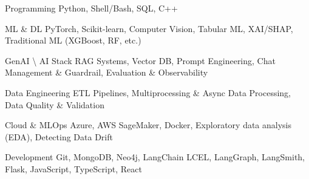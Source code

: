 

\begin{cvskills}

\vspace{0.05cm}

\cvskill
    {Programming} %
    {Python, Shell/Bash, SQL, C++} %

\vspace{0.05cm}

\cvskill
    {ML \& DL}
    {PyTorch, Scikit-learn, Computer Vision, Tabular ML, XAI/SHAP, Traditional ML (XGBoost, RF, etc.)}

\vspace{0.05cm}

\cvskill
    {GenAI \textbackslash{} AI Stack}
    {RAG Systems, Vector DB, Prompt Engineering, Chat Management \& Guardrail, Evaluation \& Observability}


\vspace{0.05cm}

\cvskill
    {Data Engineering}
    {ETL Pipelines, Multiprocessing \& Async Data Processing, Data Quality \& Validation}

\vspace{0.05cm}

\cvskill
    {Cloud \& MLOps}
    {Azure, AWS SageMaker, Docker, Exploratory data analysis (EDA), Detecting Data Drift}


\vspace{0.05cm}

\cvskill
    {Development}
    {Git, MongoDB, Neo4j, LangChain LCEL, LangGraph, LangSmith, Flask, JavaScript, TypeScript, React}


\end{cvskills}

